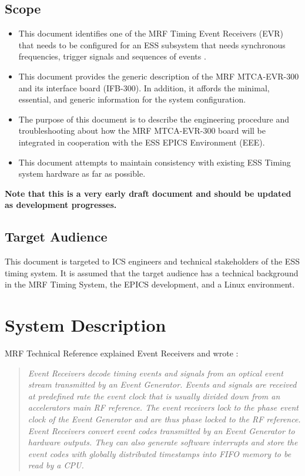 \documentclass[11pt
  , a4paper
  , article
  , oneside
  , showtrims
]{memoir}
\begin{document}
\section{Scope}
\begin{itemize}
\item This document identifies one of the MRF Timing Event Receivers (EVR) that needs to be configured for an ESS subsystem that needs synchronous frequencies, trigger signals and sequences of events \cite{MRFEVENTSYSTEMDC}.
\item This document provides the generic description of the MRF MTCA-EVR-300 and its interface board (IFB-300). In addition, it affords the minimal, essential, and generic information for the system configuration.  
\item The purpose of this document is to describe the engineering procedure and troubleshooting about how the MRF MTCA-EVR-300 board will be integrated in cooperation with the ESS EPICS Environment (EEE).
\item This document attempts to maintain consistency with existing ESS Timing system hardware as far as possible. 
\end{itemize}
\textbf{Note that this is a very early draft document and should be updated as development progresses.}

\section{Target Audience}
This document is targeted to ICS engineers and technical stakeholders of the ESS timing system. It is assumed that the target audience has a technical background in the MRF Timing System, the EPICS development, and a Linux environment.

\chapter{System Description}
MRF Technical Reference \citep[see][p45]{MRFEVENTSYSTEMDC} explained Event Receivers and wrote :
\blockquote{\textit{Event Receivers decode timing events and signals from an optical event stream transmitted by an Event Generator. Events and signals are received at predefined rate the event clock that is usually divided down from an accelerators main RF reference. The event receivers lock to the phase event clock of the Event Generator and are thus phase locked to the RF reference. Event Receivers convert event codes transmitted by an Event Generator to hardware outputs. They can also generate software interrupts and store the event codes with globally distributed timestamps into FIFO memory to be read by a CPU.}}
\end{document}
